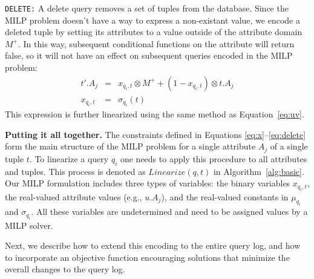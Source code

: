 \smallskip
\noindent
\texttt{DELETE:}
A delete query removes a set of tuples from the database.  
Since the MILP problem doesn't have a way to express a non-existant value, 
we encode a deleted tuple by setting its attributes to a value
outside of the attribute domain $M^+$.  In this way, subsequent conditional functions
on the attribute will return false, so it will not have an effect on subsequent queries encoded
in the MILP problem:
 {\scriptsize
\begin{eqnarray}
\label{eq:delete}
t'.A_j &=& x_{q_i, t} \otimes M^+ + (1-x_{q_i, t}) \otimes t.A_j \\
x_{q_i, t} &=& \sigma_{q_i}(t)\nonumber 
\end{eqnarray}
 }%
This expression is further linearized using the same method as Equation~\eqref{eq:uv}.

\smallskip
\noindent
\textbf{Putting it all together.}
% 
The constraints defined in Equations \eqref{eq:x}--\eqref{eq:delete}
form the main structure of the MILP problem for a single attribute
$A_j$ of a single tuple $t$. To linearize a query $q_i$ one needs to
apply this procedure to all attributes and tuples. This process is
denoted as $Linearize(q, t)$ in Algorithm~\ref{alg:basic}. Our MILP
formulation includes three types of variables: the binary variables
$x_{q_i, t}$, the real-valued attribute values (e.g., $u.A_j$), and
the real-valued constants in $\mu_{q_i}$ and $\sigma_{q_i}$. All these
variables are undetermined and need to be assigned values by a MILP
solver.


Next, we describe how to extend this encoding to the entire query log,
and how to incorporate an objective function encouraging solutions
that minimize the overall changes to the query log.







